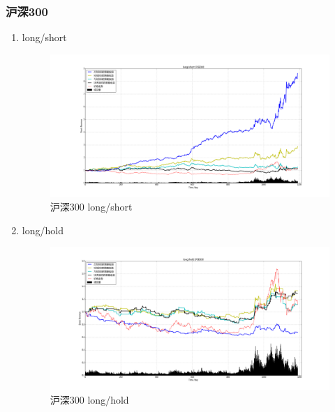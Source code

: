\documentclass[12pt,a4paper]{article}
\begin{document}
\subsubsection{沪深300}
\begin{enumerate}
\item long/short 
\begin{figure}[H]
	\centering
	\includegraphics[width=1.0\textwidth]{img_r_1/hs300.png}
	\caption{沪深300 long/short }
\end{figure}
\item long/hold 
\begin{figure}[H]
	\centering
	\includegraphics[width=1.0\textwidth]{img_r_1/hs300_1.png}
	\caption{沪深300 long/hold }
\end{figure}
\end{enumerate}
\end{document}
